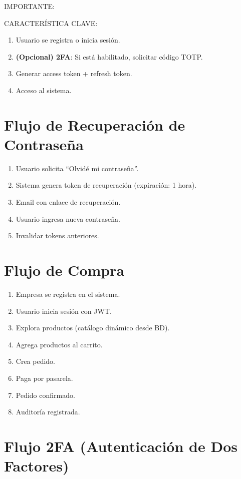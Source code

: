 \documentclass[12pt,a4paper,oneside]{book}
\begin{document}
\begin{alert}{IMPORTANTE:}
\begin{info}{CARACTERÍSTICA CLAVE:}
\begin{enumerate}
    \item Usuario se registra o inicia sesión.
    \item \textbf{(Opcional) 2FA}: Si está habilitado, solicitar código TOTP.
    \item Generar access token + refresh token.
    \item Acceso al sistema.
\end{enumerate}

\section{Flujo de Recuperación de Contraseña}
\label{flujo:password}

\begin{enumerate}
    \item Usuario solicita ``Olvidé mi contraseña''.
    \item Sistema genera token de recuperación (expiración: 1 hora).
    \item Email con enlace de recuperación.
    \item Usuario ingresa nueva contraseña.
    \item Invalidar tokens anteriores.
\end{enumerate}

\section{Flujo de Compra}
\label{flujo:compra}

\begin{enumerate}
    \item Empresa se registra en el sistema.
    \item Usuario inicia sesión con JWT.
    \item Explora productos (catálogo dinámico desde BD).
    \item Agrega productos al carrito.
    \item Crea pedido.
    \item Paga por pasarela.
    \item Pedido confirmado.
    \item Auditoría registrada.
\end{enumerate}

\section{Flujo 2FA (Autenticación de Dos Factores)}
\label{flujo:2fa}


\end{info}
\end{alert}
\end{document}
